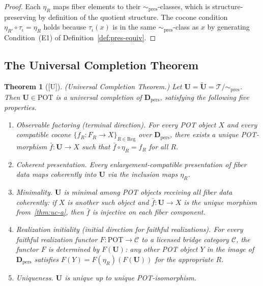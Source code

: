 \documentclass[12pt,oneside]{amsbook}
\theoremstyle{plain}
\newtheorem{theorem}{Theorem}[section]
\theoremstyle{definition}
\theoremstyle{remark}
\newcommand{\status}[1]{\textup{[#1]}}
\begin{document}
\begin{proof}
Each $\eta_R$ maps fiber elements to their $\sim_{\mathrm{pres}}$-classes,
which is structure-preserving by definition of the quotient structure.
The cocone condition $\eta_{R'} \circ \tau_\iota = \eta_R$ holds
because $\tau_\iota(x)$ is in the same $\sim_{\mathrm{pres}}$-class as
$x$ by generating Condition~(E1) of Definition~\ref{def:pres-equiv}.
\end{proof}

\subsection*{The Universal Completion Theorem}

\begin{theorem}[\status{U}]\label{thm:universal-completion}
\textup{(Universal Completion Theorem.)}  Let $\mathbf{U} =
\widetilde{\mathbf{U}} = \mathcal{T}/{\sim_{\mathrm{pres}}}$.  Then
$\mathbf{U} \in \mathrm{POT}$ is a universal completion of
$\mathbf{D}_{\mathrm{pers}}$, satisfying the following five properties.
\begin{enumerate}[label=\textup{(\alph*)}]
  \item\label{thm:uc-a} \textup{Observable factoring (terminal
        direction).}  For every POT object $X$ and every compatible
        cocone $\{f_R: F_R \to X\}_{R \in \mathrm{Reg}}$ over
        $\mathbf{D}_{\mathrm{pers}}$, there exists a unique
        POT-morphism $\bar{f}: \mathbf{U} \to X$ such that
        $\bar{f} \circ \eta_R = f_R$ for all $R$.
  \item\label{thm:uc-b} \textup{Coherent presentation.}  Every
        enlargement-compatible presentation of fiber data maps
        coherently into $\mathbf{U}$ via the inclusion maps $\eta_R$.
  \item\label{thm:uc-c} \textup{Minimality.}  $\mathbf{U}$ is minimal
        among POT objects receiving all fiber data coherently: if $X$
        is another such object and $\bar{f}: \mathbf{U} \to X$ is the
        unique morphism from~\ref{thm:uc-a}, then $\bar{f}$ is
        injective on each fiber component.
  \item\label{thm:uc-d} \textup{Realization initiality (initial
        direction for faithful realizations).}  For every faithful
        realization functor $F: \mathrm{POT} \to \mathcal{C}$ to a
        licensed bridge category $\mathcal{C}$, the functor $F$ is
        determined by $F(\mathbf{U})$: any other POT object $Y$ in the
        image of $\mathbf{D}_{\mathrm{pers}}$ satisfies
        $F(Y) = F(\eta_R)(F(\mathbf{U}))$ for the appropriate $R$.
  \item\label{thm:uc-e} \textup{Uniqueness.}  $\mathbf{U}$ is unique
        up to unique POT-isomorphism.
\end{enumerate}
\end{theorem}
\end{document}

